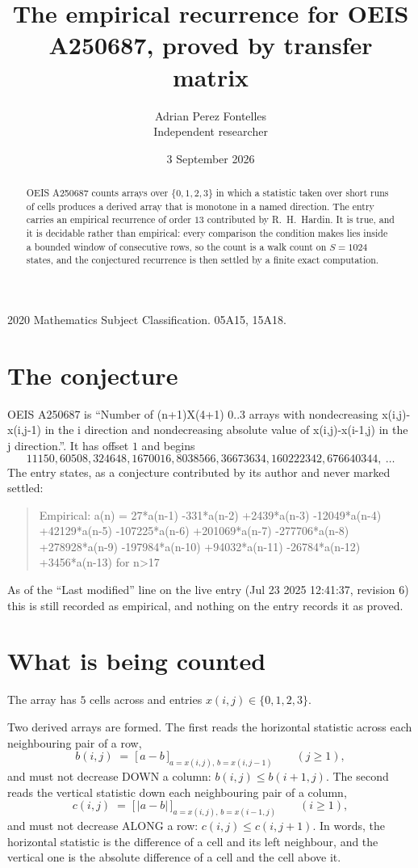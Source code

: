 \documentclass[11pt,a4paper]{article}
\title{The empirical recurrence for OEIS A250687, proved by transfer matrix}
\author{Adrian Perez Fontelles\\ \small Independent researcher}
\date{3 September 2026}
\theoremstyle{plain}
\theoremstyle{definition}
\begin{document}
\maketitle

\begin{abstract}
OEIS A250687 counts arrays over $\{0,1,2,3\}$ in which a statistic taken over short runs
of cells produces a derived array that is monotone in a named direction. The entry carries an
empirical recurrence of order $13$ contributed by R.~H.~Hardin. It is true, and it is
decidable rather than empirical: every comparison the condition makes lies inside a bounded
window of consecutive rows, so the count is a walk count on $S=1024$ states, and the
conjectured recurrence is then settled by a finite exact computation.
\end{abstract}

\noindent\small 2020 Mathematics Subject Classification. 05A15, 15A18.\normalsize

\section{The conjecture}

OEIS A250687 is ``Number of (n+1)X(4+1) 0..3 arrays with nondecreasing x(i,j)-x(i,j-1) in the i direction and nondecreasing absolute value of x(i,j)-x(i-1,j) in the j direction.''. It has offset $1$ and begins
\[
11150, 60508, 324648, 1670016, 8038566, 36673634, 160222342, 676640344,\ \dots
\]
The entry states, as a conjecture contributed by its author and never marked settled:
\begin{quote}
Empirical: a(n) = 27*a(n-1) -331*a(n-2) +2439*a(n-3) -12049*a(n-4) +42129*a(n-5) -107225*a(n-6) +201069*a(n-7) -277706*a(n-8) +278928*a(n-9) -197984*a(n-10) +94032*a(n-11) -26784*a(n-12) +3456*a(n-13) for n>17
\end{quote}
As of the ``Last modified'' line on the live entry (Jul 23 2025 12:41:37, revision 6) this is still
recorded as empirical, and nothing on the entry records it as proved.

\section{What is being counted}

The array has $5$ cells across and entries $x(i,j)\in\{0,1,2,3\}$.

Two derived arrays are formed. The first reads the horizontal statistic across each
neighbouring pair of a row,
\[
b(i,j)\;=\;\bigl[\,a-b\,\bigr]_{a=x(i,j),\,b=x(i,j-1)}\qquad (j\ge1),
\]
and must not decrease DOWN a column: $b(i,j)\le b(i{+}1,j)$. The second reads the vertical
statistic down each neighbouring pair of a column,
\[
c(i,j)\;=\;\bigl[\,\lvert a-b\rvert\,\bigr]_{a=x(i,j),\,b=x(i{-}1,j)}\qquad (i\ge1),
\]
and must not decrease ALONG a row: $c(i,j)\le c(i,j{+}1)$. In words, the horizontal statistic
is the difference of a cell and its left neighbour, and the vertical one is
the absolute difference of a cell and the cell above it.
\end{document}
